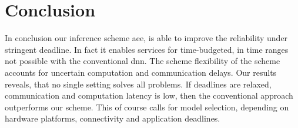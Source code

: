 \hypertarget{conclusion}{%
\chapter{Conclusion}\label{ch:conclusion}}


In conclusion our inference scheme \gls{aee}, is able to improve the reliability under stringent deadline. In fact it enables services for time-budgeted, in time ranges not possible with the conventional \gls{dnn}. The scheme flexibility of the scheme accounts for uncertain computation and communication delays. Our results reveals, that no single setting solves all problems. If deadlines are relaxed, communication and computation latency is low, then the conventional approach outperforms our scheme. This of course calls for model selection, depending on hardware platforms, connectivity and application deadlines.    